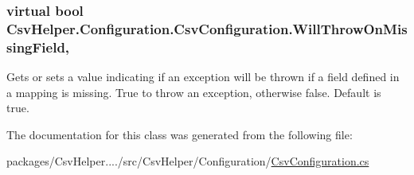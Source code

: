 \hypertarget{a00043_a13cb7999b190a01177134faa52dfa3db}{
\subsubsection[{Will\-Throw\-On\-Missing\-Field}]{\setlength{\rightskip}{0pt plus 5cm}virtual bool Csv\-Helper.\-Configuration.\-Csv\-Configuration.\-Will\-Throw\-On\-Missing\-Field\hspace{0.3cm}{\ttfamily [get]}, {\ttfamily [set]}}}\label{a00043_a13cb7999b190a01177134faa52dfa3db}


Gets or sets a value indicating if an exception will be thrown if a field defined in a mapping is missing. True to throw an exception, otherwise false. Default is true. 



The documentation for this class was generated from the following file\-:\begin{DoxyCompactItemize}
\item 
packages/\-Csv\-Helper..../src/\-Csv\-Helper/\-Configuration/\hyperlink{a00185}{Csv\-Configuration.\-cs}\end{DoxyCompactItemize}
